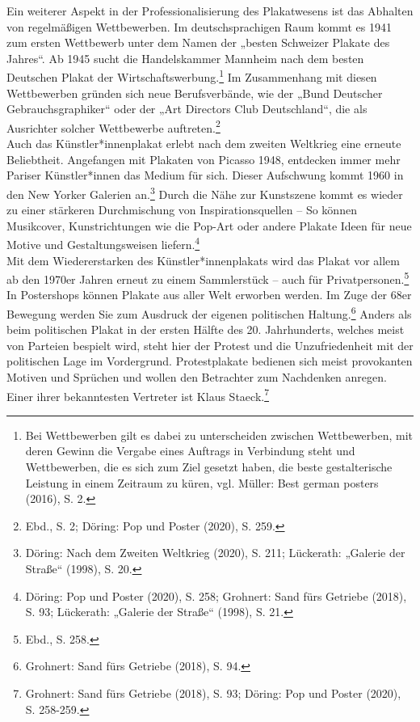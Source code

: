 \documentclass[a4paper,12pt,ngerman]{article}
\begin{document}
Ein weiterer Aspekt in der Professionalisierung des Plakatwesens ist das Abhalten von regelmäßigen Wettbewerben. Im deutschsprachigen Raum kommt es 1941 zum ersten Wettbewerb unter dem Namen der „besten Schweizer Plakate des Jahres“. Ab 1945 sucht die Handelskammer Mannheim nach dem besten Deutschen Plakat der Wirtschaftswerbung.\footnote{Bei Wettbewerben gilt es dabei zu unterscheiden zwischen Wettbewerben, mit deren Gewinn die Vergabe eines Auftrags in Verbindung steht und Wettbewerben, die es sich zum Ziel gesetzt haben, die beste gestalterische Leistung in einem Zeitraum zu küren, vgl. Müller: Best german posters (2016), S. 2.}  Im Zusammenhang mit diesen Wettbewerben gründen sich neue Berufsverbände, wie der „Bund Deutscher Gebrauchsgraphiker“ oder der „Art Directors Club Deutschland“, die als Ausrichter solcher Wettbewerbe auftreten.\footnote{Ebd., S. 2; Döring: Pop und Poster (2020), S. 259.} \\
Auch das Künstler*innenplakat erlebt nach dem zweiten Weltkrieg eine erneute Beliebtheit. Angefangen mit Plakaten von Picasso 1948, entdecken immer mehr Pariser Künstler*innen das Medium für sich. Dieser Aufschwung kommt 1960 in den New Yorker Galerien an.\footnote{Döring: Nach dem Zweiten Weltkrieg (2020), S. 211; Lückerath: „Galerie der Straße“ (1998), S. 20.}  Durch die Nähe zur Kunstszene kommt es wieder zu einer stärkeren Durchmischung von Inspirationsquellen -- So können Musikcover, Kunstrichtungen wie die Pop-Art oder andere Plakate Ideen für neue Motive und Gestaltungsweisen liefern.\footnote{Döring: Pop und Poster (2020), S. 258; Grohnert: Sand fürs Getriebe (2018), S. 93; Lückerath: „Galerie der Straße“ (1998), S. 21.} \\
Mit dem Wiedererstarken des Künstler*innenplakats wird das Plakat vor allem ab den 1970er Jahren erneut zu einem Sammlerstück -- auch für Privatpersonen.\footnote{Ebd., S. 258.}  In Postershops können Plakate aus aller Welt erworben werden. Im Zuge der 68er Bewegung werden Sie zum Ausdruck der eigenen politischen Haltung.\footnote{Grohnert: Sand fürs Getriebe (2018), S. 94.}  Anders als beim politischen Plakat in der ersten Hälfte des 20. Jahrhunderts, welches meist von Parteien bespielt wird, steht hier der Protest und die Unzufriedenheit mit der politischen Lage im Vordergrund. Protestplakate bedienen sich meist provokanten Motiven und Sprüchen und wollen den Betrachter zum Nachdenken anregen. Einer ihrer bekanntesten Vertreter ist Klaus Staeck.\footnote{Grohnert: Sand fürs Getriebe (2018), S. 93; Döring: Pop und Poster (2020), S. 258-259.} \\
\end{document}
